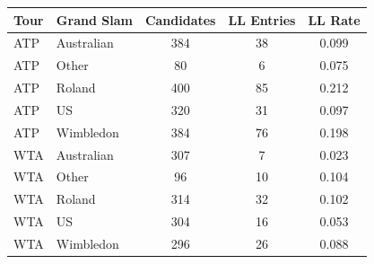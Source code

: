 \begin{tabular}{llccc}
\toprule
Tour & Grand Slam & Candidates & LL Entries & LL Rate \\
\midrule
ATP & Australian & 384 & 38 & 0.099 \\
ATP & Other & 80 & 6 & 0.075 \\
ATP & Roland & 400 & 85 & 0.212 \\
ATP & US & 320 & 31 & 0.097 \\
ATP & Wimbledon & 384 & 76 & 0.198 \\
WTA & Australian & 307 & 7 & 0.023 \\
WTA & Other & 96 & 10 & 0.104 \\
WTA & Roland & 314 & 32 & 0.102 \\
WTA & US & 304 & 16 & 0.053 \\
WTA & Wimbledon & 296 & 26 & 0.088 \\
\bottomrule
\end{tabular}
